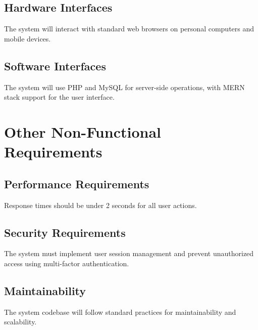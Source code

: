 \documentclass{article}
\begin{document}
	\subsection{Hardware Interfaces}
	The system will interact with standard web browsers on personal computers and mobile devices.
	
	\subsection{Software Interfaces}
	The system will use PHP and MySQL for server-side operations, with MERN stack support for the user interface.
	
	\section{Other Non-Functional Requirements}
	
	\subsection{Performance Requirements}
	Response times should be under 2 seconds for all user actions.
	
	\subsection{Security Requirements}
	The system must implement user session management and prevent unauthorized access using multi-factor authentication.
	
	\subsection{Maintainability}
	The system codebase will follow standard practices for maintainability and scalability.
	
\end{document}
